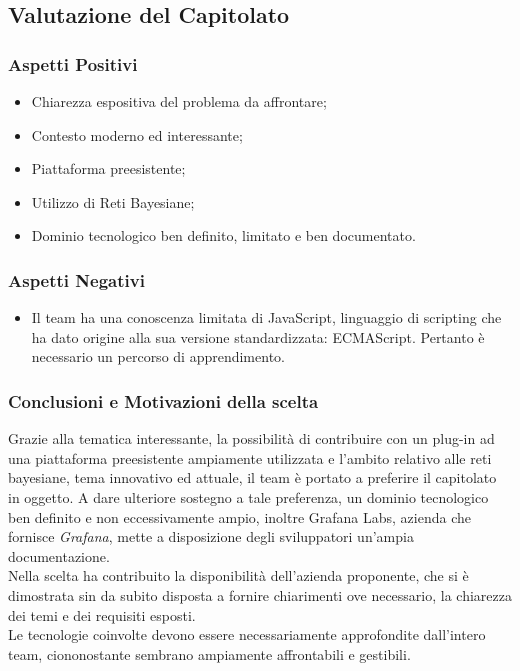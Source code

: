 \subsection{Valutazione del Capitolato}
\subsubsection{Aspetti Positivi}
\begin{itemize}
	\item Chiarezza espositiva del problema da affrontare;
	\item Contesto moderno ed interessante;
	\item Piattaforma preesistente;
	\item Utilizzo di Reti Bayesiane;
	\item Dominio tecnologico ben definito, limitato e ben documentato.
\end{itemize}

\subsubsection{Aspetti Negativi}
\begin{itemize}
	\item Il team ha una conoscenza limitata di JavaScript\glossario, linguaggio di scripting che ha dato origine alla sua versione standardizzata: ECMAScript. Pertanto è necessario un percorso di apprendimento.
\end{itemize}

\subsubsection{Conclusioni e Motivazioni della scelta}
Grazie alla tematica interessante, la possibilità di contribuire con un plug-in ad una piattaforma preesistente ampiamente utilizzata e l'ambito relativo alle reti bayesiane, tema innovativo ed attuale, il team è portato a preferire il capitolato in oggetto. A dare ulteriore sostegno a tale preferenza, un dominio tecnologico ben definito e non eccessivamente ampio, inoltre {Grafana Labs}, azienda che fornisce \textit{Grafana}, mette a disposizione degli sviluppatori un'ampia documentazione.\\
 Nella scelta ha contribuito la disponibilità dell'azienda proponente, che si è dimostrata sin da subito disposta a fornire chiarimenti ove necessario, la chiarezza dei temi e dei requisiti esposti.\\
Le tecnologie coinvolte devono essere necessariamente approfondite dall'intero team, ciononostante sembrano  ampiamente affrontabili e gestibili.

